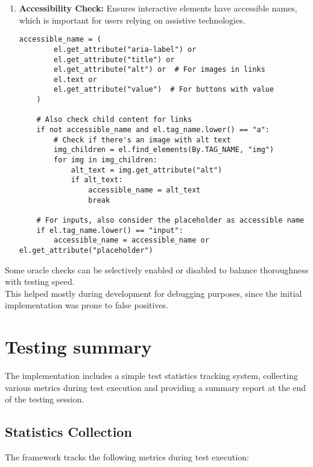 \begin{enumerate}
\begin{lstlisting}[caption={Detecting broken images}]
    \end{lstlisting}

    \item \textbf{Accessibility Check:} Ensures interactive elements have accessible names, which is important for users relying on assistive technologies.
    \begin{lstlisting}[caption={Testing accessibility}]
    accessible_name = (
        el.get_attribute("aria-label") or 
        el.get_attribute("title") or 
        el.get_attribute("alt") or  # For images in links
        el.text or 
        el.get_attribute("value")  # For buttons with value
    )
    
    # Also check child content for links
    if not accessible_name and el.tag_name.lower() == "a":
        # Check if there's an image with alt text
        img_children = el.find_elements(By.TAG_NAME, "img")
        for img in img_children:
            alt_text = img.get_attribute("alt")
            if alt_text:
                accessible_name = alt_text
                break
    
    # For inputs, also consider the placeholder as accessible name
    if el.tag_name.lower() == "input":
        accessible_name = accessible_name or el.get_attribute("placeholder")
    \end{lstlisting}
\end{enumerate}

Some oracle checks can be selectively enabled or disabled to balance thoroughness with testing speed.\\
This helped mostly during development for debugging purposes, since the initial implementation was prone to false positives.

\section{Testing summary}

The implementation includes a simple test statistics tracking system, collecting various metrics during test execution and providing a summary report at the end of the testing session.

\subsection{Statistics Collection}

The framework tracks the following metrics during test execution:

